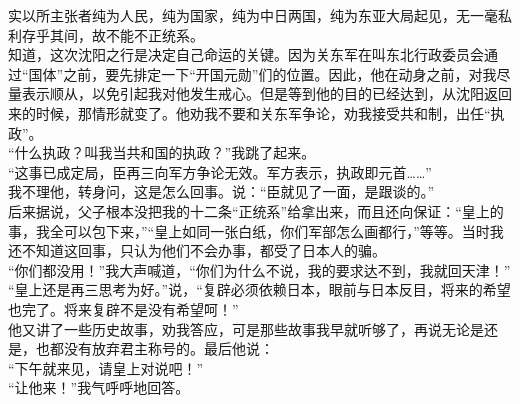 实以所主张者纯为人民，纯为国家，纯为中日两国，纯为东亚大局起见，无一毫私利存乎其间，故不能不正统系。\\

知道，这次沈阳之行是决定自己命运的关键。因为关东军在叫东北行政委员会通过“国体”之前，要先排定一下“开国元勋”们的位置。因此，他在动身之前，对我尽量表示顺从，以免引起我对他发生戒心。但是等到他的目的已经达到，从沈阳返回来的时候，那情形就变了。他劝我不要和关东军争论，劝我接受共和制，出任“执政”。\\

“什么执政？叫我当共和国的执政？”我跳了起来。\\

“这事已成定局，臣再三向军方争论无效。军方表示，执政即元首……”\\

我不理他，转身问，这是怎么回事。说：“臣就见了一面，是跟谈的。”\\

后来据说，父子根本没把我的十二条“正统系”给拿出来，而且还向保证：“皇上的事，我全可以包下来，”“皇上如同一张白纸，你们军部怎么画都行，”等等。当时我还不知道这回事，只认为他们不会办事，都受了日本人的骗。\\

“你们都没用！”我大声喊道，“你们为什么不说，我的要求达不到，我就回天津！”\\

“皇上还是再三思考为好。”说，“复辟必须依赖日本，眼前与日本反目，将来的希望也完了。将来复辟不是没有希望呵！”\\

他又讲了一些历史故事，劝我答应，可是那些故事我早就听够了，再说无论是还是，也都没有放弃君主称号的。最后他说：\\

“下午就来见，请皇上对说吧！”\\

“让他来！”我气呼呼地回答。
